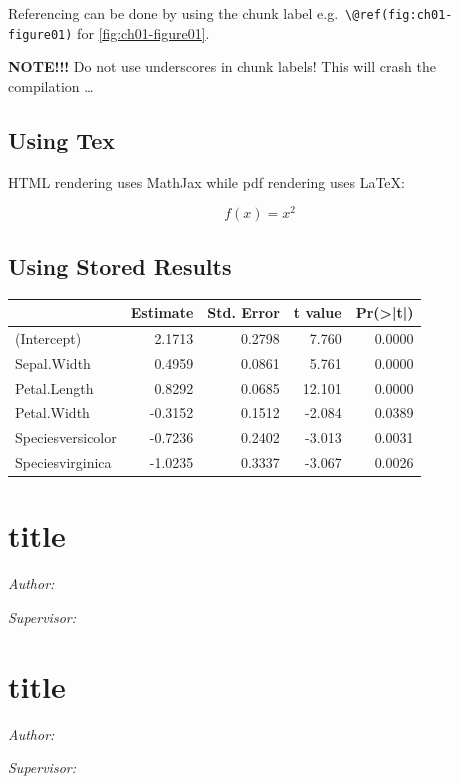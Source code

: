 \documentclass[
]{krantz}
\begin{document}
Referencing can be done by using the chunk label e.g.~\texttt{\textbackslash{}@ref(fig:ch01-figure01)} for \ref{fig:ch01-figure01}.

\textbf{NOTE!!!} Do not use underscores in chunk labels! This will crash the compilation \ldots{}

\hypertarget{using-tex}{%
\section{Using Tex}\label{using-tex}}

HTML rendering uses MathJax while pdf rendering uses LaTeX:

\[
f(x) = x^2
\]

\hypertarget{using-stored-results}{%
\section{Using Stored Results}\label{using-stored-results}}

\begin{tabular}{l|r|r|r|r}
\hline
  & Estimate & Std. Error & t value & Pr(>|t|)\\
\hline
(Intercept) & 2.1713 & 0.2798 & 7.760 & 0.0000\\
\hline
Sepal.Width & 0.4959 & 0.0861 & 5.761 & 0.0000\\
\hline
Petal.Length & 0.8292 & 0.0685 & 12.101 & 0.0000\\
\hline
Petal.Width & -0.3152 & 0.1512 & -2.084 & 0.0389\\
\hline
Speciesversicolor & -0.7236 & 0.2402 & -3.013 & 0.0031\\
\hline
Speciesvirginica & -1.0235 & 0.3337 & -3.067 & 0.0026\\
\hline
\end{tabular}

\hypertarget{title-2}{%
\chapter{title}\label{title-2}}

\emph{Author: }

\emph{Supervisor: }

\hypertarget{title-3}{%
\chapter{title}\label{title-3}}

\emph{Author: }

\emph{Supervisor: }
\end{document}
